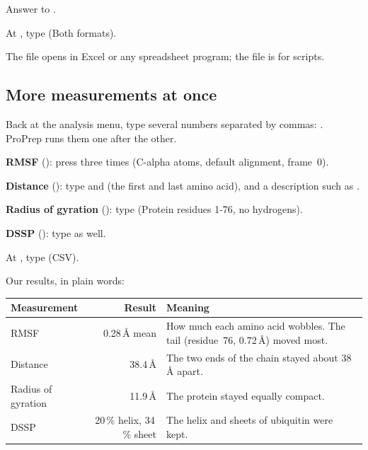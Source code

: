 \begin{steps}[resume]
  \item Answer  to .
  \item At , type  (Both formats).
\end{steps}

The  file opens in Excel or any spreadsheet program; the
 file is for scripts.

\subsection{More measurements at once}

Back at the analysis menu, type several numbers separated by commas:
. ProPrep runs them one after the other.

\begin{steps}[resume]
  \item \textbf{RMSF} (): press  three times (C-alpha atoms,
        default alignment, frame~0).
  \item \textbf{Distance} (): type  and 
        (the first and last amino acid), and a description such as
        .
  \item \textbf{Radius of gyration} (): type  (Protein residues
        1-76, no hydrogens).
  \item \textbf{DSSP} (): type  as well.
  \item At , type  (CSV).
\end{steps}

Our results, in plain words:

\begin{tabularx}{\linewidth}{@{}lrL@{}}
\toprule
\textbf{Measurement} & \textbf{Result} & \textbf{Meaning} \\
\midrule
RMSF & 0.28\,Å mean & How much each amino acid wobbles. The tail
  (residue~76, 0.72\,Å) moved most. \\
Distance & 38.4\,Å & The two ends of the chain stayed about 38\,Å apart. \\
Radius of gyration & 11.9\,Å & The protein stayed equally compact. \\
DSSP & 20\,\% helix, 34\,\% sheet & The helix and sheets of ubiquitin
  were kept. \\
\bottomrule
\end{tabularx}

